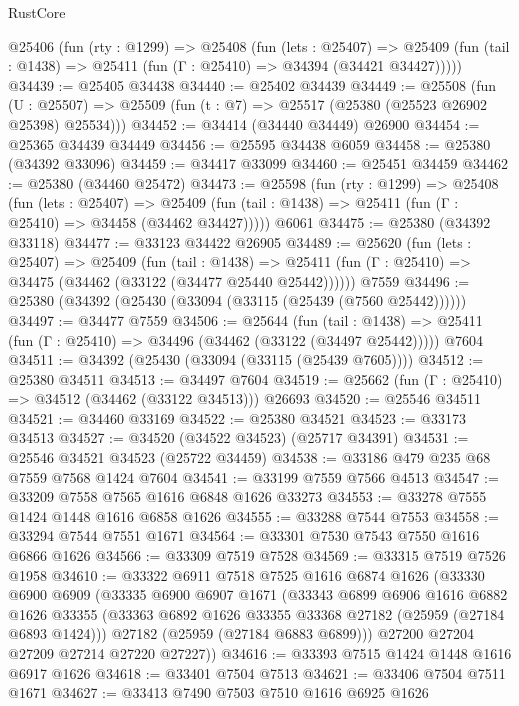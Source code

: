 \begin{lexlean}{RustCore}
\begin{coremodule}
  @25406
    (fun (rty : @1299) =>
    @25408
      (fun (lets : @25407) =>
      @25409 (fun (tail : @1438) => @25411 (fun (Γ : @25410) => @34394 (@34421 @34427)))))
@34439 := @25405 @34438
@34440 := @25402 @34439
@34449 := @25508
    (fun (U : @25507) => @25509 (fun (t : @7) => @25517 (@25380 (@25523 @26902 @25398) @25534)))
@34452 := @34414 (@34440 @34449) @26900
@34454 := @25365 @34439 @34449
@34456 := @25595 @34438 @6059
@34458 := @25380 (@34392 @33096)
@34459 := @34417 @33099
@34460 := @25451 @34459
@34462 := @25380 (@34460 @25472)
@34473 := @25598
    (fun (rty : @1299) =>
    @25408
      (fun (lets : @25407) =>
      @25409 (fun (tail : @1438) => @25411 (fun (Γ : @25410) => @34458 (@34462 @34427)))))
    @6061
@34475 := @25380 (@34392 @33118)
@34477 := @33123 @34422 @26905
@34489 := @25620
    (fun (lets : @25407) =>
    @25409
      (fun (tail : @1438) =>
      @25411 (fun (Γ : @25410) => @34475 (@34462 (@33122 (@34477 @25440 @25442))))))
    @7559
@34496 := @25380 (@34392 (@25430 (@33094 (@33115 (@25439 (@7560 @25442))))))
@34497 := @34477 @7559
@34506 := @25644
    (fun (tail : @1438) => @25411 (fun (Γ : @25410) => @34496 (@34462 (@33122 (@34497 @25442)))))
    @7604
@34511 := @34392 (@25430 (@33094 (@33115 (@25439 @7605))))
@34512 := @25380 @34511
@34513 := @34497 @7604
@34519 := @25662 (fun (Γ : @25410) => @34512 (@34462 (@33122 @34513))) @26693
@34520 := @25546 @34511
@34521 := @34460 @33169
@34522 := @25380 @34521
@34523 := @33173 @34513
@34527 := @34520 (@34522 @34523) (@25717 @34391)
@34531 := @25546 @34521 @34523 (@25722 @34459)
@34538 := @33186 @479 @235 @68 @7559 @7568 @1424 @7604
@34541 := @33199 @7559 @7566 @4513
@34547 := @33209 @7558 @7565 @1616 @6848 @1626 @33273
@34553 := @33278 @7555 @1424 @1448 @1616 @6858 @1626
@34555 := @33288 @7544 @7553
@34558 := @33294 @7544 @7551 @1671
@34564 := @33301 @7530 @7543 @7550 @1616 @6866 @1626
@34566 := @33309 @7519 @7528
@34569 := @33315 @7519 @7526 @1958
@34610 := @33322
    @6911
    @7518
    @7525
    @1616
    @6874
    @1626
    (@33330
      @6900
      @6909
      (@33335
        @6900
        @6907
        @1671
        (@33343
          @6899
          @6906
          @1616
          @6882
          @1626
          @33355
          (@33363 @6892 @1626 @33355 @33368 @27182 (@25959 (@27184 @6893 @1424)))
          @27182
          (@25959 (@27184 @6883 @6899)))
        @27200
        @27204
        @27209
        @27214
        @27220
        @27227))
@34616 := @33393 @7515 @1424 @1448 @1616 @6917 @1626
@34618 := @33401 @7504 @7513
@34621 := @33406 @7504 @7511 @1671
@34627 := @33413 @7490 @7503 @7510 @1616 @6925 @1626

\end{coremodule}
\end{lexlean}
